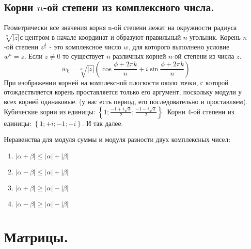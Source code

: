 \documentclass[a4paper,14pt]{article}
\begin{document}
\subsection{Корни $n$-ой степени из комплексного числа.}
Геометрически все значения корня n-ой степени лежат на окружности радиуса $\sqrt[n]{\left|z\right|}$с центром в начале координат и образуют правильный $n$-угольник. Корень $n$-ой степени $z^\frac{1}{n}$ - это комплексное число $w$, для которого выполнено условие $w^n=z$. Если $z \ne 0$ то существует $n$ различных корней $n$-ой степени из числа $z$.
\[w_k=\sqrt[n]{\left|z\right|} \left(\cos \frac{\phi + 2 \pi k}{n} + i \sin \frac{\phi + 2 \pi k}{n}\right)\]
При изображении корней на комплексной плоскости около точки, с которой отождествляется корень проставляется только его аргумент, поскольку модули у всех корней одинаковые. (у нас есть период, его последовательно и проставляем).
\noindent Кубические корни из единицы: $\left\{1; \frac{-1+i \sqrt{3}}{2}; \frac{-1-i \sqrt{3}}{2}\right\}$. Корни 4-ой степени из единицы: $\left\{1; +i; -1; -i\right\}$. И так далее.
\begin{remark}
	Неравенства для модуля суммы и модуля разности двух комплексных чисел:
	\begin{enumerate}
		\item $|\alpha + \beta| \leq |\alpha| + |\beta|$
		\item $|\alpha - \beta| \leq |\alpha| + |\beta|$
		\item $|\alpha + \beta| \geq |\alpha| - |\beta|$
		\item $|\alpha - \beta| \geq |\alpha| - |\beta|$
	\end{enumerate}
\end{remark}
\section{Матрицы.}
\end{document}

